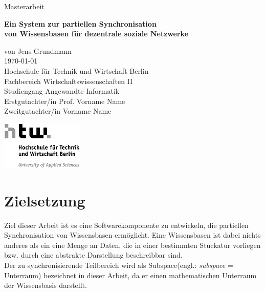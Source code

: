 \documentclass[a4paper]{article}
\begin{document}
	\begin{titlepage}
		\begin{flushright}	
			{\large Masterarbeit \\}
			\begin{Large}
				\textbf{
					Ein System zur partiellen Synchronisation \\ 
					von Wissensbasen für dezentrale soziale Netzwerke \\
				} 
			\end{Large}
			\vspace{1.0cm}
			\begin{large}	
				von Jens Grundmann \\
				\today \\
				\vspace{1.0cm}
				Hochschule für Technik und Wirtschaft Berlin \\
				Fachbereich Wirtschaftswissenschaften II \\
				Studiengang Angewandte Informatik \\
				\vspace{1.0cm}
				Erstgutachter/in Prof. Vorname Name \\
				Zweitgutachter/in Vorname Name \\	
				\vspace{0.5cm}
				\begin{center}
					\includegraphics{../Bilder/htw_logo.jpg}
				\end{center}				
			\end{large}
		\end{flushright}	
	\end{titlepage}
	
	\ClearWallPaper
	\tableofcontents
	\newpage

	\section{Zielsetzung}
	
	Ziel dieser Arbeit ist es eine Softwarekomponente zu entwickeln, die 
	partiellen Synchronisation von Wissensbasen ermöglicht. Eine Wissensbasen
	ist dabei nichts anderes als ein eine Menge an Daten, die in einer
	bestimmten Stuckatur vorliegen bzw. durch eine abstrakte Darstellung
	beschreibbar sind. \\
	Der zu synchronisierende Teilbereich wird als Subspace(engl.:
	\emph{subspace} = Unterraum) bezeichnet in dieser Arbeit, da er einen
	mathematischen Unterraum der Wissensbasis darstellt.
	
\end{document}
